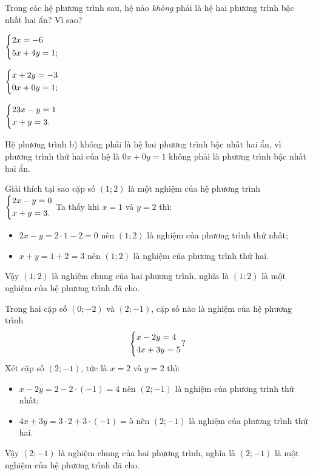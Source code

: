 \noidungsanpham

\begin{vidu}
    Trong các hệ phương trình sau, hệ nào \textit{không} phải là hệ hai phương trình bậc nhất hai ẩn? Vì sao?
    \begin{listEX}
        \item $\left\{\begin{aligned}&2x = -6 \\ &5x + 4y = 1;\end{aligned}\right.$
        \item $\left\{\begin{aligned}&x + 2y = -3 \\ &0x + 0y = 1;\end{aligned}\right.$
        \item $\left\{\begin{aligned}&23x - y = 1 \\ &x + y = 3.\end{aligned}\right.$
    \end{listEX}
    \doicot
    Hệ phương trình b) không phải là hệ hai phương trình bậc nhất hai ẩn, vì phương trình thứ hai của hệ là $0x + 0y = 1$ không phải là phương trình bậc nhất hai ẩn.
\end{vidu}

\begin{vidu}
    Giải thích tại sao cặp số $(1; 2)$ là một nghiệm của hệ phương trình $\left\{\begin{aligned} &2x - y = 0 \\ &x + y = 3.\end{aligned}\right.$
    \doicot
    Ta thấy khi $x = 1$ và $y = 2$ thì:
    \begin{itemize}
        \item $2x - y = 2 \cdot 1 - 2 = 0$ nên $(1; 2)$ là nghiệm của phương trình thứ nhất;
        \item $x + y = 1 + 2 = 3$ nên $(1; 2)$ là nghiệm của phương trình thứ hai.
    \end{itemize}
    Vậy $(1; 2)$ là nghiệm chung của hai phương trình, nghĩa là $(1; 2)$ là một nghiệm của hệ phương trình đã cho.
\end{vidu}

\begin{luyentap}
    Trong hai cặp số $(0;-2)$ và $(2;-1)$, cặp số nào là nghiệm của hệ phương trình
    $$\left\{\begin{aligned}&x-2y=4\\&4x+3y=5\end{aligned}\right.?$$
    \doicot
    Xét cặp số $(2;-1)$, tức là $x = 2$ và $y = 2$ thì:
    \begin{itemize}
        \item $x-2y=2-2\cdot(-1)=4$ nên $(2; -1)$ là nghiệm của phương trình thứ nhất;
        \item $4x+3y=3\cdot2+3\cdot(-1)=5$ nên $(2; -1)$ là nghiệm của phương trình thứ hai.
    \end{itemize}
    Vậy $(2; -1)$ là nghiệm chung của hai phương trình, nghĩa là $(2; -1)$ là một nghiệm của hệ phương trình đã cho.
\end{luyentap}

